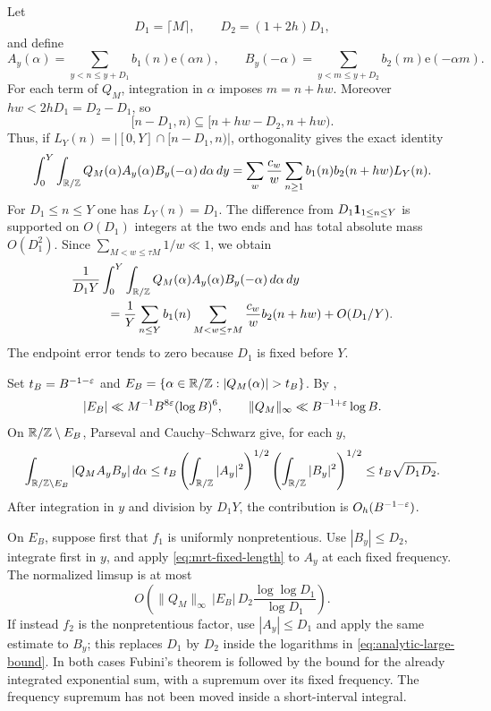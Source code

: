 Let
\[
 D_1=\lceil M\rceil,\qquad D_2=(1+2h)D_1,
\]
and define
\[
 A_y(\alpha)=\sum_{y<n\le y+D_1}b_1(n)\mathrm e(\alpha n),
 \qquad
 B_y(-\alpha)=\sum_{y<m\le y+D_2}b_2(m)\mathrm e(-\alpha m).
\]
For each term of $Q_M$, integration in $\alpha$ imposes $m=n+hw$.
Moreover $hw<2hD_1=D_2-D_1$, so
\[
 [n-D_1,n)\subseteq[n+hw-D_2,n+hw).
\]
Thus, if $L_Y(n)=|[0,Y]\cap[n-D_1,n)|$, orthogonality gives the exact
identity
\[
 \int_0^Y\int_{\mathbb R/\mathbb Z}Q_M(\alpha)A_y(\alpha)B_y(-\alpha)
                 \,d\alpha\,dy
 =\sum_w\frac{c_w}{w}\sum_{n\ge1}b_1(n)b_2(n+hw)L_Y(n).
\]
For $D_1\le n\le Y$ one has $L_Y(n)=D_1$. The difference from
$D_1\mathbf 1_{1\le n\le Y}$ is supported on $O(D_1)$ integers at the two
ends and has total absolute mass $O(D_1^2)$. Since
$\sum_{M<w\le\tau M}1/w\ll1$, we obtain
\begin{equation}\label{eq:analytic-overlap}
 \begin{split}
 &\frac1{D_1Y}\int_0^Y\int_{\T}
        Q_M(\alpha)A_y(\alpha)B_y(-\alpha)\,d\alpha\,dy\\
 &\hspace{10mm}=
 \frac1Y\sum_{n\le Y}b_1(n)
       \sum_{M<w\le\tau M}\frac{c_w}{w}b_2(n+hw)
       +O(D_1/Y).
 \end{split}
\end{equation}
The endpoint error tends to zero because $D_1$ is fixed before $Y$.

Set $t_B=B^{-1-\varepsilon}$ and
$E_B=\{\alpha\in\T:|Q_M(\alpha)|>t_B\}$.
By ,
\begin{equation}\label{eq:rough-large-frequencies}
 |E_B|\ll M^{-1}B^{8\varepsilon}(\log B)^6,
 \qquad \|Q_M\|_\infty\ll B^{-1+\varepsilon}\log B.
\end{equation}
On $\mathbb R/\mathbb Z\setminus E_B$, Parseval and Cauchy--Schwarz give, for each $y$,
\[
 \int_{\mathbb R/\mathbb Z\setminus E_B}|Q_M A_y B_y|\,d\alpha
 \le t_B\left(\int_{\mathbb R/\mathbb Z}|A_y|^2\right)^{1/2}
             \left(\int_{\mathbb R/\mathbb Z}|B_y|^2\right)^{1/2}
 \le t_B\sqrt{D_1D_2}.
\]
After integration in $y$ and division by $D_1Y$, the contribution is
$O_h(B^{-1-\varepsilon})$.

On $E_B$, suppose first that $f_1$ is uniformly nonpretentious.
Use $|B_y|\le D_2$, integrate first in $y$, and apply
\eqref{eq:mrt-fixed-length} to $A_y$ at each fixed frequency. The
normalized limsup is at most
\begin{equation}\label{eq:analytic-large-bound}
 O\left(\|Q_M\|_\infty\,|E_B|\,D_2
                    \frac{\log\log D_1}{\log D_1}\right).
\end{equation}
If instead $f_2$ is the nonpretentious factor, use $|A_y|\le D_1$
and apply the same estimate to $B_y$; this replaces $D_1$ by $D_2$
inside the logarithms in \eqref{eq:analytic-large-bound}.
In both cases Fubini's theorem is followed by the bound for the
already integrated exponential sum, with a supremum over its fixed
frequency. The frequency supremum has not been moved inside a
short-interval integral.

